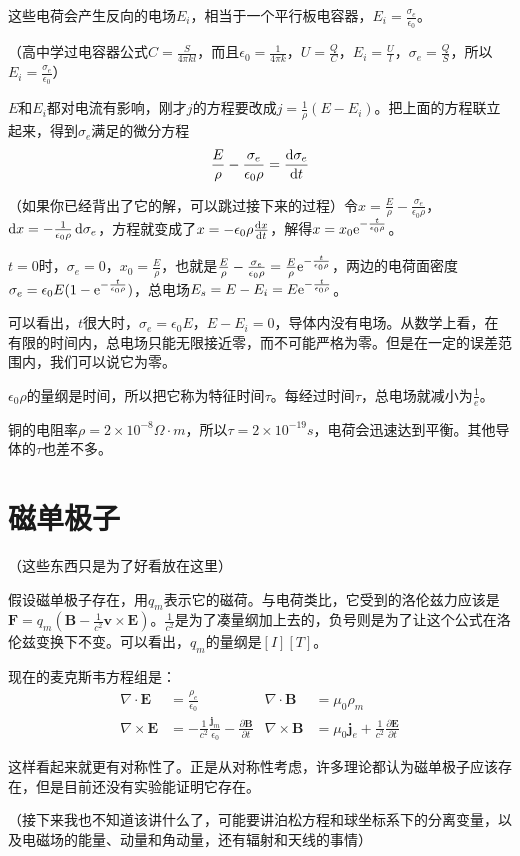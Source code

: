 这些电荷会产生反向的电场$E_i$，相当于一个平行板电容器，$E_i=\frac{\sigma_e}{\epsilon_0}$。

（高中学过电容器公式$C=\frac{S}{4 \pi k l}$，而且$\epsilon_0=\frac{1}{4 \pi k}$，$U=\frac{Q}{C}$，$E_i=\frac{U}{l}$，$\sigma_e=\frac{Q}{S}$，所以$E_i=\frac{\sigma_e}{\epsilon_0}$）

$E$和$E_i$都对电流有影响，刚才$j$的方程要改成$j=\frac{1}{\rho}(E-E_i)$。把上面的方程联立起来，得到$\sigma_e$满足的微分方程
\begin{equation*}
\frac{E}{\rho}-\frac{\sigma_e}{\epsilon_0 \rho}=\frac{\mathop{}\!\mathrm{d} \sigma_e}{\mathop{}\!\mathrm{d} t}
\end{equation*}

（如果你已经背出了它的解，可以跳过接下来的过程）令$x=\frac{E}{\rho}-\frac{\sigma_e}{\epsilon_0 \rho}$，$\mathop{}\!\mathrm{d} x=-\frac{1}{\epsilon_0 \rho} \mathop{}\!\mathrm{d} \sigma_e$，方程就变成了$x=-\epsilon_0 \rho \frac{\mathop{}\!\mathrm{d} x}{\mathop{}\!\mathrm{d} t}$，解得$x=x_0 \mathrm{e}^{-\frac{t}{\epsilon_0 \rho}}$。

$t=0$时，$\sigma_e=0$，$x_0=\frac{E}{\rho}$，也就是$\frac{E}{\rho}-\frac{\sigma_e}{\epsilon_0 \rho}=\frac{E}{\rho} \mathrm{e}^{-\frac{t}{\epsilon_0 \rho}}$，两边的电荷面密度$\sigma_e=\epsilon_0 E (1-\mathrm{e}^{-\frac{t}{\epsilon_0 \rho}})$，总电场$E_s=E-E_i=E \mathrm{e}^{-\frac{t}{\epsilon_0 \rho}}$。

可以看出，$t$很大时，$\sigma_e=\epsilon_0 E$，$E-E_i=0$，导体内没有电场。从数学上看，在有限的时间内，总电场只能无限接近零，而不可能严格为零。但是在一定的误差范围内，我们可以说它为零。

$\epsilon_0 \rho$的量纲是时间，所以把它称为特征时间$\tau$。每经过时间$\tau$，总电场就减小为$\frac{1}{e}$。

铜的电阻率$\rho=2 \times 10^{-8} \unit{\Omega \cdot m}$，所以$\tau=2 \times 10^{-19} \unit{s}$，电荷会迅速达到平衡。其他导体的$\tau$也差不多。
\section{磁单极子}
（这些东西只是为了好看放在这里）

假设磁单极子存在，用$q_m$表示它的磁荷。与电荷类比，它受到的洛伦兹力应该是$\mathbf{F}=q_m(\mathbf{B}-\frac{1}{c^2} \mathbf{v} \times \mathbf{E})$。$\frac{1}{c^2}$是为了凑量纲加上去的，负号则是为了让这个公式在洛伦兹变换下不变。可以看出，$q_m$的量纲是$[I] [T]$。

现在的麦克斯韦方程组是：
\begin{align*}
\nabla \cdot \mathbf{E}&=\frac{\rho_e}{\epsilon_0} & \nabla \cdot \mathbf{B}&=\mu_0 \rho_m \\
\nabla \times \mathbf{E}&=-\frac{1}{c^2} \frac{\mathbf{j}_m}{\epsilon_0}-\frac{\partial \mathbf{B}}{\partial t} & \nabla \times \mathbf{B}&=\mu_0 \mathbf{j}_e+\frac{1}{c^2} \frac{\partial \mathbf{E}}{\partial t}
\end{align*}

这样看起来就更有对称性了。正是从对称性考虑，许多理论都认为磁单极子应该存在，但是目前还没有实验能证明它存在。

（接下来我也不知道该讲什么了，可能要讲泊松方程和球坐标系下的分离变量，以及电磁场的能量、动量和角动量，还有辐射和天线的事情）
